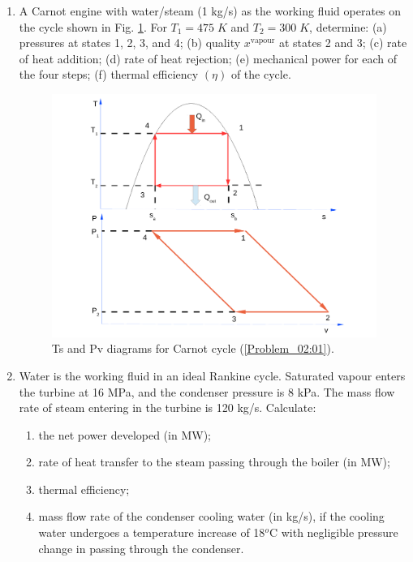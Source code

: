 \documentclass[12pts,a4paper,amsmath,amssymb,floatfix]{article}%
\begin{document}
\begin{enumerate}[label=\bfseries Problem \arabic*]
\item \label{Problem_02:01}A Carnot engine with water/steam (1 kg/s) as the working fluid operates on the cycle shown in Fig. \ref{PVTSDiags}. For $T_{1}=475\;K$ and $T_{2}=300\;K$, determine: (a) pressures at states 1, 2, 3, and 4; (b) quality $x^{\text{vapour}}$ at states 2 and 3; (c) rate of heat addition; (d) rate of heat rejection; (e) mechanical power for each of the four steps; (f) thermal efficiency $\left(\eta\right)$ of the cycle.
   \begin{figure}[h]
    \begin{center}
     \includegraphics[width=12.cm,clip]{./Pics/Carnot_PV_TS}
    \end{center}
    \caption{Ts and Pv diagrams for Carnot cycle (\ref{Problem_02:01}).}\label{PVTSDiags}
   \end{figure}    


\item\label{Tut03:Saphiro8.6} Water is the working fluid in an ideal Rankine cycle. Saturated vapour enters the turbine at 16 MPa, and the condenser pressure is 8 kPa. The mass flow rate of steam entering in the turbine is 120 kg/s. Calculate:
\begin{enumerate}
\item the net power developed (in MW);
\item rate of heat transfer to the steam passing through the boiler (in MW);
\item thermal efficiency;
\item mass flow rate of the condenser cooling water (in kg/s), if the cooling water undergoes a temperature increase of 18$^{o}$C with negligible pressure change in passing through the condenser.
\end{enumerate} 




\end{enumerate}
\end{document}
